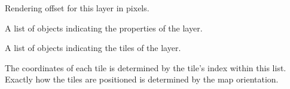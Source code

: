 \documentclass[letterpaper,10pt,english]{sphinxmanual}
\begin{document}
\begin{fulllineitems}

\begin{fulllineitems}
\label{index:tmx.Layer.offsety}
Rendering offset for this layer in pixels.

\end{fulllineitems}


\begin{fulllineitems}
\label{index:tmx.Layer.properties}
A list of {\hyperref[index:tmx.Property]{\emph{}}} objects indicating the properties of
the layer.

\end{fulllineitems}


\begin{fulllineitems}
\label{index:tmx.Layer.tiles}
A list of {\hyperref[index:tmx.LayerTile]{\emph{}}} objects indicating the tiles of the
layer.

The coordinates of each tile is determined by the tile's index
within this list.  Exactly how the tiles are positioned is
determined by the map orientation.

\end{fulllineitems}


\end{fulllineitems}

\end{document}
